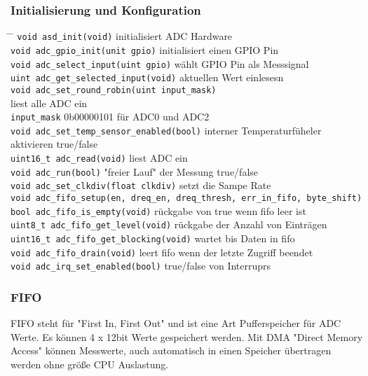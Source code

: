 \documentclass[a4paper,12pt,twoside]{article}
\begin{document}
\subsubsection{Initialisierung und Konfiguration}
\begin{tabbing}
	\hspace{5mm} \= \hspace{80mm} \= \kill
	\> \verb|void asd_init(void)| \> initialisiert ADC Hardware \\
	\> \verb|void adc_gpio_init(unit gpio)| \> initialisiert einen GPIO Pin \\
	\> \verb|void adc_select_input(uint gpio)| \> wählt GPIO Pin als Messsignal \\
	\> \verb|uint adc_get_selected_input(void)| \> aktuellen Wert einlesesn \\
	\> \verb|void adc_set_round_robin(uint input_mask)| \\
	\> \hspace{2mm}liest alle ADC ein \\
	\> \verb|input_mask| \> 0b00000101 für ADC0 und ADC2 \\
	\> \verb|void adc_set_temp_sensor_enabled(bool)| \> interner Temperaturfüheler aktivieren true/false \\
	\> \verb|uint16_t adc_read(void)| \> liest ADC ein \\
	\> \verb|void adc_run(bool)| \> "freier Lauf" der Messung true/false \\
	\> \verb|void adc_set_clkdiv(float clkdiv)| \> setzt die Sampe Rate \\
	\> \verb|void adc_fifo_setup(en, dreq_en, dreq_thresh, err_in_fifo, byte_shift)| \\
	\> \verb|bool adc_fifo_is_empty(void)| \> rückgabe von true wenn fifo leer ist \\
	\> \verb|uint8_t adc_fifo_get_level(void)| \> rückgabe der Anzahl von Einträgen \\
	\> \verb|uint16_t adc_fifo_get_blocking(void)| \> wartet bis Daten in fifo \\
	\> \verb|void adc_fifo_drain(void)| \> leert fifo wenn der letzte Zugriff beendet \\
	\> \verb|void adc_irq_set_enabled(bool)| \> true/false von Interruprs \\
\end{tabbing}
\subsubsection{FIFO}
FIFO steht für "First In, First Out" und ist eine Art Pufferspeicher für ADC Werte.
Es können 4 x 12bit Werte gespeichert werden. Mit DMA "Direct Memory Access" können Messwerte,
auch automatisch in einen Speicher übertragen werden ohne größe CPU Auslastung.
\end{document}
